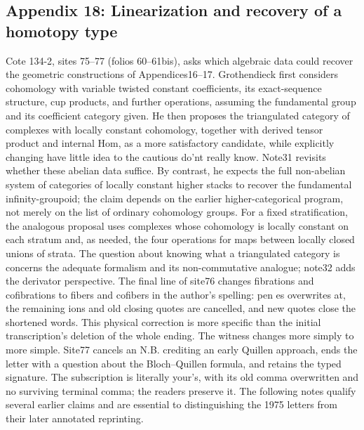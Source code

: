 \subsection*{Appendix 18: Linearization and recovery of a homotopy type}
Cote 134-2, sites 75--77 (folios 60--61bis), asks which algebraic data could recover the geometric constructions of Appendices16--17. Grothendieck first considers cohomology with variable twisted constant coefficients, its exact-sequence structure, cup products, and further operations, assuming the fundamental group and its coefficient category given. He then proposes the triangulated category of complexes with locally constant cohomology, together with derived tensor product and internal Hom, as a more satisfactory candidate, while explicitly changing have little idea to the cautious do'nt really know. Note31 revisits whether these abelian data suffice. By contrast, he expects the full non-abelian system of categories of locally constant higher stacks to recover the fundamental infinity-groupoid; the claim depends on the earlier higher-categorical program, not merely on the list of ordinary cohomology groups. For a fixed stratification, the analogous proposal uses complexes whose cohomology is locally constant on each stratum and, as needed, the four operations for maps between locally closed unions of strata. The question about knowing what a triangulated category is concerns the adequate formalism and its non-commutative analogue; note32 adds the derivator perspective. The final line of site76 changes fibrations and cofibrations to fibers and cofibers in the author's spelling: pen es overwrites at, the remaining ions and old closing quotes are cancelled, and new quotes close the shortened words. This physical correction is more specific than the initial transcription's deletion of the whole ending. The witness changes more simply to more simple. Site77 cancels an N.B. crediting an early Quillen approach, ends the letter with a question about the Bloch--Quillen formula, and retains the typed signature. The subscription is literally your's, with its old comma overwritten and no surviving terminal comma; the readers preserve it. The following notes qualify several earlier claims and are essential to distinguishing the 1975 letters from their later annotated reprinting.

